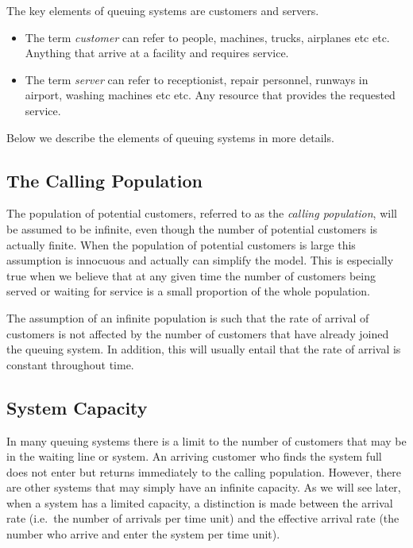 \documentclass[
]{book}
\begin{document}
The key elements of queuing systems are customers and servers.

\begin{itemize}
\item
  The term \emph{customer} can refer to people, machines, trucks, airplanes etc etc. Anything that arrive at a facility and requires service.
\item
  The term \emph{server} can refer to receptionist, repair personnel, runways in airport, washing machines etc etc. Any resource that provides the requested service.
\end{itemize}

Below we describe the elements of queuing systems in more details.

\hypertarget{the-calling-population}{%
\subsection{The Calling Population}\label{the-calling-population}}

The population of potential customers, referred to as the \emph{calling population}, will be assumed to be infinite, even though the number of potential customers is actually finite. When the population of potential customers is large this assumption is innocuous and actually can simplify the model. This is especially true when we believe that at any given time the number of customers being served or waiting for service is a small proportion of the whole population.

The assumption of an infinite population is such that the rate of arrival of customers is not affected by the number of customers that have already joined the queuing system. In addition, this will usually entail that the rate of arrival is constant throughout time.

\hypertarget{system-capacity}{%
\subsection{System Capacity}\label{system-capacity}}

In many queuing systems there is a limit to the number of customers that may be in the waiting line or system. An arriving customer who finds the system full does not enter but returns immediately to the calling population. However, there are other systems that may simply have an infinite capacity. As we will see later, when a system has a limited capacity, a distinction is made between the arrival rate (i.e.~the number of arrivals per time unit) and the effective arrival rate (the number who arrive and enter the system per time unit).
\end{document}
